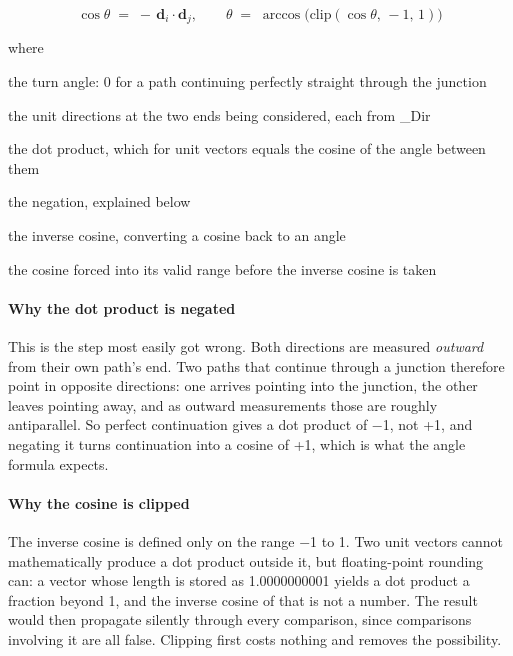 \begin{equation}
\cos\theta \;=\; -\,\mathbf{d}_i \cdot \mathbf{d}_j, \qquad \theta \;=\; \arccos\big(\mathrm{clip}(\cos\theta,\,-1,\,1)\big)
\end{equation}

\noindent where
\begin{description}[leftmargin=2.4em,style=nextline,font=\normalfont\ttfamily]\setlength\itemsep{1pt}
  \item[{$\theta$}] \normalfont the turn angle: 0 for a path continuing perfectly straight through the junction
  \item[{$\mathbf{d}_i,\, \mathbf{d}_j$}] \normalfont the unit directions at the two ends being considered, each from \_Dir
  \item[{$\cdot$}] \normalfont the dot product, which for unit vectors equals the cosine of the angle between them
  \item[{$-$}] \normalfont the negation, explained below
  \item[{$\arccos$}] \normalfont the inverse cosine, converting a cosine back to an angle
  \item[{$\mathrm{clip}(\cdot,-1,1)$}] \normalfont the cosine forced into its valid range before the inverse cosine is taken
\end{description}

\paragraph{Why the dot product is negated}
This is the step most easily got wrong. Both directions are measured \emph{outward} from their own path's end. Two paths that continue through a junction therefore point in opposite directions: one arrives pointing into the junction, the other leaves pointing away, and as outward measurements those are roughly antiparallel. So perfect continuation gives a dot product of $-$1, not +1, and negating it turns continuation into a cosine of +1, which is what the angle formula expects.


\paragraph{Why the cosine is clipped}
The inverse cosine is defined only on the range $-$1 to 1. Two unit vectors cannot mathematically produce a dot product outside it, but floating-point rounding can: a vector whose length is stored as 1.0000000001 yields a dot product a fraction beyond 1, and the inverse cosine of that is not a number. The result would then propagate silently through every comparison, since comparisons involving it are all false. Clipping first costs nothing and removes the possibility.



